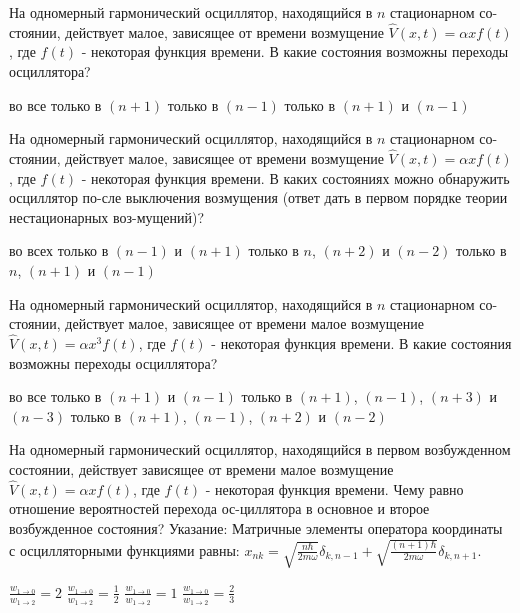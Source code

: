 \documentclass[11pt,a4paper]{exam}
\begin{document}
\begin{questions}
\question На одномерный гармонический осциллятор, находящийся в $n$ стационарном со-стоянии, действует малое, зависящее от времени возмущение $\hat V(x,t) = \alpha xf(t)$, где $f(t)$ - некоторая функция времени. В какие состояния возможны переходы осциллятора?
\begin{choices}
\choice во все            
\choice только в $(n + 1)$
\choice только в $(n - 1)$         
\choice только в $(n + 1)$ и $(n - 1)$
\end{choices}

\question На одномерный гармонический осциллятор, находящийся в $n$ стационарном со-стоянии, действует малое, зависящее от времени возмущение $\hat V(x,t) = \alpha xf(t)$, где $f(t)$ - некоторая функция времени. В каких состояниях можно обнаружить осциллятор по-сле выключения возмущения (ответ дать в первом порядке теории нестационарных воз-мущений)?
\begin{choices}
\choice во всех           
\choice только в $(n - 1)$ и $(n + 1)$
\choice только в $n$, $(n + 2)$ и $(n - 2)$ 
\choice только в $n$, $(n + 1)$ и $(n - 1)$
\end{choices}

\question На одномерный гармонический осциллятор, находящийся в $n$ стационарном со-стоянии, действует малое, зависящее от времени малое возмущение $\hat V(x,t) = \alpha {x^3}f(t)$, где $f(t)$ - некоторая функция времени. В какие состояния возможны переходы осциллятора?
\begin{choices}
\choice во все
\choice только в $(n + 1)$ и $(n - 1)$
\choice только в $(n + 1)$, $(n - 1)$, $(n + 3)$ и $(n - 3)$
\choice только в $(n + 1)$, $(n - 1)$, $(n + 2)$ и $(n - 2)$
\end{choices}

\question  На одномерный гармонический осциллятор, находящийся в первом возбужденном состоянии, действует зависящее от времени малое возмущение $\hat V(x,t) = \alpha xf(t)$, где $f(t)$ - некоторая функция времени. Чему равно отношение вероятностей перехода ос-циллятора в основное и второе возбужденное состояния? Указание: Матричные элементы оператора координаты с осцилляторными функциями равны: ${x_{nk}} = \sqrt {\frac{{n\hbar }}{{2m\omega }}} {\delta _{k,n - 1}} + \sqrt {\frac{{(n + 1)\hbar }}{{2m\omega }}} {\delta _{k,n + 1}}$.
\begin{choices}
\choice $\frac{{{w_{1 \to 0}}}}{{{w_{1 \to 2}}}} = 2$      
\choice $\frac{{{w_{1 \to 0}}}}{{{w_{1 \to 2}}}} = \frac{1}{2}$     
\choice $\frac{{{w_{1 \to 0}}}}{{{w_{1 \to 2}}}} = 1$      
\choice $\frac{{{w_{1 \to 0}}}}{{{w_{1 \to 2}}}} = \frac{2}{3}$
\end{choices}


\end{questions}
\end{document}
